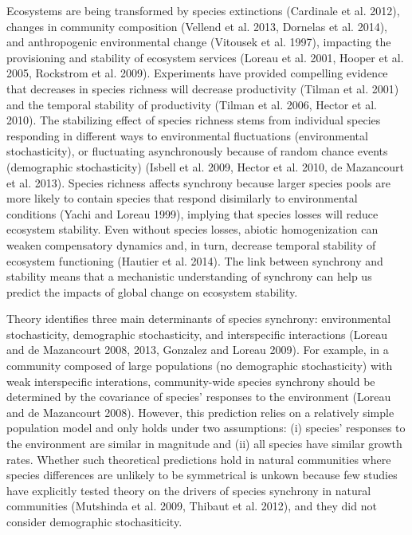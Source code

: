 \documentclass[12pt,]{article}
\begin{document}
Ecosystems are being transformed by species extinctions (Cardinale et
al. 2012), changes in community composition (Vellend et al. 2013,
Dornelas et al. 2014), and anthropogenic environmental change (Vitousek
et al. 1997), impacting the provisioning and stability of ecosystem
services (Loreau et al. 2001, Hooper et al. 2005, Rockstrom et al.
2009). Experiments have provided compelling evidence that decreases in
species richness will decrease productivity (Tilman et al. 2001) and the
temporal stability of productivity (Tilman et al. 2006, Hector et al.
2010). The stabilizing effect of species richness stems from individual
species responding in different ways to environmental fluctuations
(environmental stochasticity), or fluctuating asynchronously because of
random chance events (demographic stochasticity) (Isbell et al. 2009,
Hector et al. 2010, {{de Mazancourt}} et al. 2013). Species richness
affects synchrony because larger species pools are more likely to
contain species that respond disimilarly to environmental conditions
(Yachi and Loreau 1999), implying that species losses will reduce
ecosystem stability. Even without species losses, abiotic homogenization
can weaken compensatory dynamics and, in turn, decrease temporal
stability of ecosystem functioning (Hautier et al. 2014). The link
between synchrony and stability means that a mechanistic understanding
of synchrony can help us predict the impacts of global change on
ecosystem stability.

Theory identifies three main determinants of species synchrony:
environmental stochasticity, demographic stochasticity, and
interspecific interactions (Loreau and {{de Mazancourt}} 2008, 2013,
Gonzalez and Loreau 2009). For example, in a community composed of large
populations (no demographic stochasticity) with weak interspecific
interations, community-wide species synchrony should be determined by
the covariance of species' responses to the environment (Loreau and {{de
Mazancourt}} 2008). However, this prediction relies on a relatively
simple population model and only holds under two assumptions: (i)
species' responses to the environment are similar in magnitude and (ii)
all species have similar growth rates. Whether such theoretical
predictions hold in natural communities where species differences are
unlikely to be symmetrical is unkown because few studies have explicitly
tested theory on the drivers of species synchrony in natural communities
(Mutshinda et al. 2009, Thibaut et al. 2012), and they did not consider
demographic stochasiticity.
\end{document}
